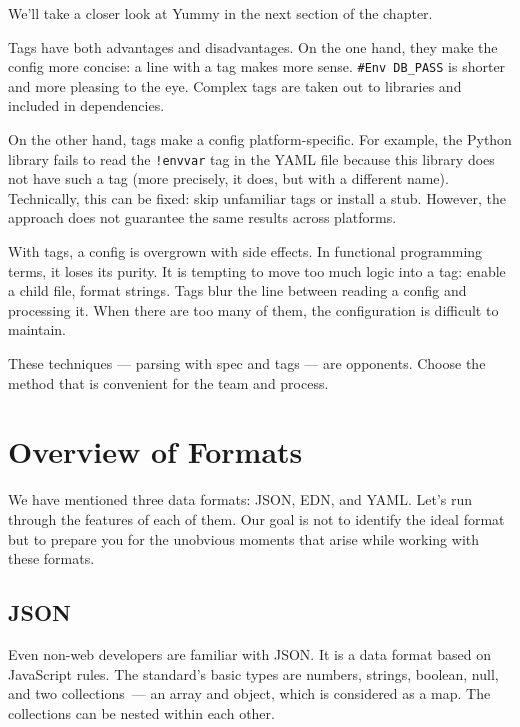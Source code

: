 \fi

\noindent
We'll take a closer look at Yummy in the next section of the chapter.

Tags have both advantages and disadvantages. On the one hand, they make the config more concise: a line with a tag makes more sense. \verb|#Env DB_PASS| is shorter and more pleasing to the eye. Complex tags are taken out to libraries and included in dependencies.

On the other hand, tags make a config platform-specific. For example, the Python library fails to read the \verb|!envvar| tag in the YAML file because this library does not have such a tag (more precisely, it does, but with a different name). Technically, this can be fixed: skip unfamiliar tags or install a stub. However, the approach does not guarantee the same results across platforms.

With tags, a config is overgrown with side effects. In functional programming terms, it loses its purity. It is tempting to move too much logic into a tag: enable a child file, format strings. Tags blur the line between reading a config and processing it. When there are too many of them, the configuration is difficult to maintain.

These techniques — parsing with spec and tags — are opponents. Choose the method that is convenient for the team and process.

\section{Overview of Formats}

We have mentioned three data formats: JSON, EDN, and YAML. Let's run through the features of each of them.  Our goal is not to identify the ideal format but to prepare you for the unobvious moments that arise while working with these formats.

\subsection{JSON}


Even non-web developers are familiar with JSON. It is a data format based on JavaScript rules. The standard's basic types are numbers, strings, boolean, null, and two collections~--- an array and object, which is considered as a map. The collections can be nested within each other.


